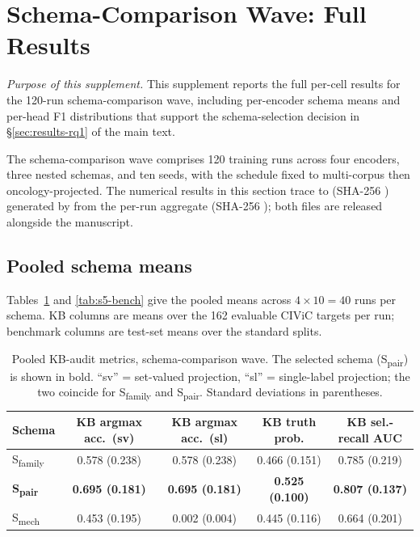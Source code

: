 \section{Schema-Comparison Wave: Full Results}
\label{supp:wave-a}

\textit{Purpose of this supplement.}\;
This supplement reports the full per-cell results for the 120-run
schema-comparison wave, including per-encoder schema means and
per-head F1 distributions that support the schema-selection
decision in \S\ref{sec:results-rq1} of the main text.

The schema-comparison wave comprises 120 training runs across four
encoders, three nested schemas, and ten seeds, with the schedule
fixed to multi-corpus then oncology-projected. The numerical results
in this section trace to
 (SHA-256
) generated by
 from the
per-run aggregate  (SHA-256
); both files are released alongside
the manuscript.

\subsection{Pooled schema means}

Tables~\ref{tab:s5-kb} and \ref{tab:s5-bench} give the pooled means
across $4 \times 10 = 40$ runs per schema. KB columns are means over
the 162 evaluable CIViC targets per run; benchmark columns are
test-set means over the standard splits.

\begin{table}[H]
\centering
\caption{Pooled KB-audit metrics, schema-comparison wave. The
selected schema (S\textsubscript{pair}) is shown in bold.
``sv'' = set-valued projection, ``sl'' = single-label projection;
the two coincide for S\textsubscript{family} and S\textsubscript{pair}.
Standard deviations in parentheses.}
\label{tab:s5-kb}
\small
\begin{tabular}{@{}lcccc@{}}
\toprule
\textbf{Schema} & \textbf{KB argmax acc.\ (sv)} & \textbf{KB argmax acc.\ (sl)} & \textbf{KB truth prob.} & \textbf{KB sel.-recall AUC} \\
\midrule
S\textsubscript{family}    & 0.578 (0.238) & 0.578 (0.238) & 0.466 (0.151) & 0.785 (0.219) \\
\textbf{S\textsubscript{pair}} & \textbf{0.695 (0.181)} & \textbf{0.695 (0.181)} & \textbf{0.525 (0.100)} & \textbf{0.807 (0.137)} \\
S\textsubscript{mech}      & 0.453 (0.195) & 0.002 (0.004) & 0.445 (0.116) & 0.664 (0.201) \\
\bottomrule
\end{tabular}
\end{table}

